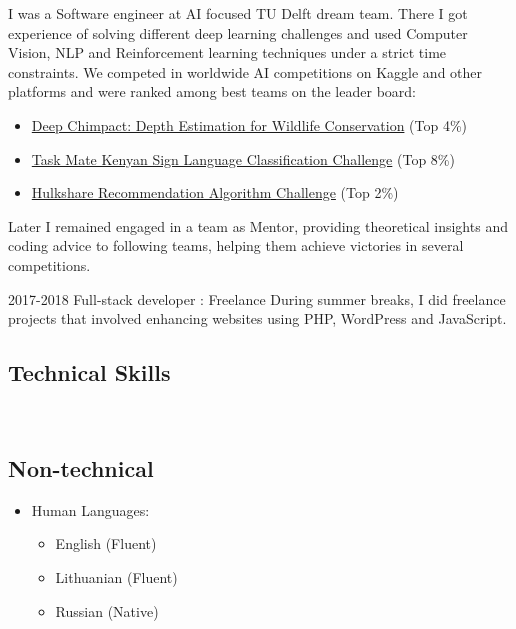 \documentclass{article}
\begin{document}
{I was a Software engineer at AI focused TU Delft dream team. There I got experience of solving different deep learning challenges and used Computer Vision, NLP and Reinforcement learning techniques under a strict time constraints.  We competed in worldwide AI competitions on Kaggle and other platforms and were ranked among best teams on the leader board:
\begin{itemize}
    \item \href{https://www.drivendata.org/competitions/82/competition-wildlife-video-depth-estimation/}{Deep Chimpact: Depth Estimation for Wildlife Conservation} (Top 4\%)
    \item \href{https://zindi.africa/competitions/kenyan-sign-language-classification-challenge}{Task Mate Kenyan Sign Language Classification Challenge} (Top 8\%)
    \item \href{https://zindi.africa/competitions/hulkshare-recommendation-algorithm-challenge}{Hulkshare Recommendation Algorithm Challenge} (Top 2\%)
\end{itemize}
Later I remained engaged in a team as Mentor, providing theoretical insights and coding advice to following teams, helping them achieve victories in several competitions.
}
\cvitem
{2017-2018}
{Full-stack developer}
{: Freelance}
{During summer breaks, I did freelance projects that involved enhancing websites using PHP, WordPress and JavaScript.}

\subsection{Technical Skills}

\\[-2.5em]
\subsection{Non-technical}

\begin{itemize}
    \item Human Languages:
    \begin{itemize}
        \item English (Fluent)
        \item Lithuanian (Fluent)
        \item Russian (Native)
    \end{itemize}
\end{itemize}
\end{document}
